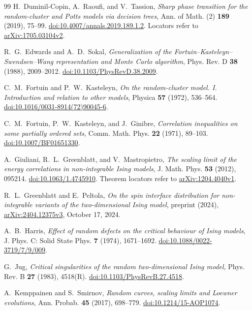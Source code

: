 \begin{thebibliography}{99}
H.~Duminil-Copin, A.~Raoufi, and V.~Tassion,
\emph{Sharp phase transition for the random-cluster and Potts models via decision trees},
Ann. of Math. (2) \textbf{189} (2019), 75--99.
\href{https://doi.org/10.4007/annals.2019.189.1.2}{doi:10.4007/\allowbreak annals.2019.189.1.2}.
Locators refer to \href{https://arxiv.org/abs/1705.03104v2}{arXiv:1705.03104v2}.

R.~G.~Edwards and A.~D.~Sokal,
\emph{Generalization of the Fortuin--Kasteleyn--Swendsen--Wang representation and Monte Carlo algorithm},
Phys. Rev. D \textbf{38} (1988), 2009--2012.
\href{https://doi.org/10.1103/PhysRevD.38.2009}{doi:10.1103/PhysRevD.38.2009}.

C.~M.~Fortuin and P.~W.~Kasteleyn,
\emph{On the random-cluster model. I. Introduction and relation to other models},
Physica \textbf{57} (1972), 536--564.
\href{https://doi.org/10.1016/0031-8914(72)90045-6}{doi:10.1016/0031-8914(72)90045-6}.

C.~M.~Fortuin, P.~W.~Kasteleyn, and J.~Ginibre,
\emph{Correlation inequalities on some partially ordered sets},
Comm. Math. Phys. \textbf{22} (1971), 89--103.
\href{https://doi.org/10.1007/BF01651330}{doi:10.1007/BF01651330}.

A.~Giuliani, R.~L.~Greenblatt, and V.~Mastropietro,
\emph{The scaling limit of the energy correlations in non-integrable Ising models},
J. Math. Phys. \textbf{53} (2012), 095214.
\href{https://doi.org/10.1063/1.4745910}{doi:10.1063/1.4745910}.
Theorem locators refer to \href{https://arxiv.org/abs/1204.4040v1}{arXiv:1204.4040v1}.

R.~L.~Greenblatt and E.~Peltola,
\emph{On the spin interface distribution for non-integrable variants of the two-dimensional Ising model},
preprint (2024), \href{https://arxiv.org/abs/2404.12375v3}{arXiv:2404.12375v3}, October 17, 2024.

A.~B.~Harris,
\emph{Effect of random defects on the critical behaviour of Ising models},
J. Phys. C: Solid State Phys. \textbf{7} (1974), 1671--1692.
\href{https://doi.org/10.1088/0022-3719/7/9/009}{doi:10.1088/0022-3719/7/9/009}.

G.~Jug,
\emph{Critical singularities of the random two-dimensional Ising model},
Phys. Rev. B \textbf{27} (1983), 4518(R).
\href{https://doi.org/10.1103/PhysRevB.27.4518}{doi:10.1103/PhysRevB.27.4518}.

A.~Kemppainen and S.~Smirnov,
\emph{Random curves, scaling limits and Loewner evolutions},
Ann. Probab. \textbf{45} (2017), 698--779.
\href{https://doi.org/10.1214/15-AOP1074}{doi:10.1214/15-AOP1074}.


\end{thebibliography}
